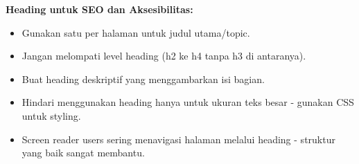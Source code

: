 \begin{konsep}
\textbf{Heading untuk SEO dan Aksesibilitas:}
\begin{itemize}[leftmargin=*]
  \item Gunakan satu  per halaman untuk judul utama/topic.
  \item Jangan melompati level heading (h2 ke h4 tanpa h3 di antaranya).
  \item Buat heading deskriptif yang menggambarkan isi bagian.
  \item Hindari menggunakan heading hanya untuk ukuran teks besar - gunakan CSS untuk styling.
  \item Screen reader users sering menavigasi halaman melalui heading - struktur yang baik sangat membantu.
\end{itemize}
\end{konsep}


